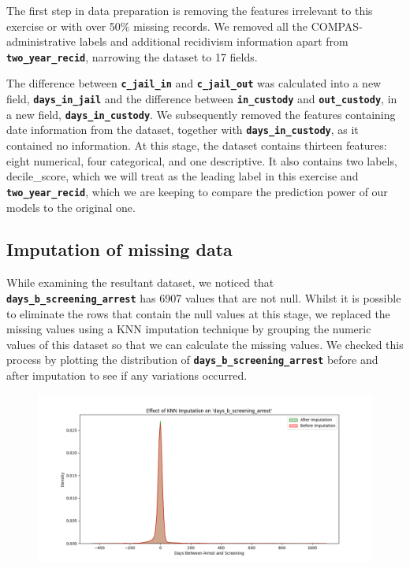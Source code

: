 The first step in data preparation is removing the features irrelevant to this exercise or with over 50\% missing records. We removed all the COMPAS-administrative labels and additional recidivism information apart from \textbf{\texttt{two\_year\_recid}}, narrowing the dataset to 17 fields.

The difference between \textbf{\texttt{c\_jail\_in}} and \textbf{\texttt{c\_jail\_out}} was calculated into a new field, \textbf{\texttt{days\_in\_jail}} and the difference between \textbf{\texttt{in\_custody}} and \textbf{\texttt{out\_custody}}, in a new field, \textbf{\texttt{days\_in\_custody}}. We subsequently removed the features containing date information from the dataset, together with \textbf{\texttt{days\_in\_custody}}, as it contained no information. At this stage, the dataset contains thirteen features: eight numerical, four categorical, and one descriptive. It also contains two labels, decile\_score, which we will treat as the leading label in this exercise and \textbf{\texttt{two\_year\_recid}}, which we are keeping to compare the prediction power of our models to the original one.


\subsection{Imputation of missing data}

While examining the resultant dataset, we noticed that \textbf{\texttt{days\_b\_screening\_arrest}} has  6907 values that are not null. Whilst it is possible to eliminate the rows that contain the null values at this stage, we replaced the missing values using a KNN imputation technique by grouping the numeric values of this dataset so that we can calculate the missing values. We checked this process by plotting the distribution of \textbf{\texttt{days\_b\_screening\_arrest}} before and after imputation to see if any variations occurred.

\begin{figure}[h!]
	\centering
	\includegraphics[width=0.9\linewidth]{img/imputation}
	\caption[Distribution \textbf{\texttt{days\_b\_screening\_arrest}} of before and after KNN imputation]{}
	\label{fig:imputation}
\end{figure}

